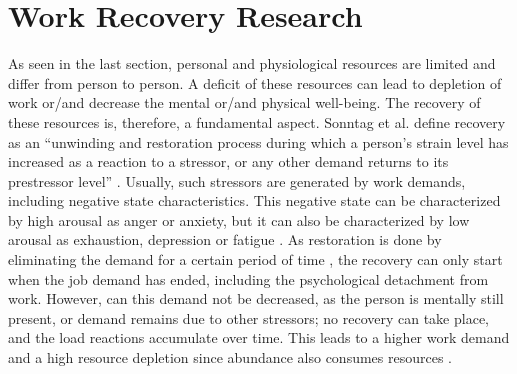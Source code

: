 \documentclass{hasel_thesis}
\begin{document}
 \section{Work Recovery Research}
  \begin{comment} 
 - why are we looking at recovery for work --> many knowledge workers are stressed and recovery is key
  - How can we recharge this resources
 - Different ways of recovery: 
    - organisational
    individual -->breaks

 
\end{comment}
As seen in the last section, personal and physiological resources are limited and differ from person to person. A deficit of these resources can lead to depletion of work or/and decrease the mental or/and physical well-being. The recovery of these resources is, therefore, a fundamental aspect. Sonntag et al. define recovery as an “unwinding and restoration process during which a person’s strain level has increased as a reaction to a stressor, or any other demand returns to its prestressor level” \cite[p.366]{Sonnentag.2017}. Usually, such stressors are generated by work demands, including negative state characteristics. This negative state can be characterized by high arousal as anger or anxiety, but it can also be characterized by low arousal as exhaustion, depression or fatigue \cite{Sonnentag.2022}. As restoration is done by eliminating the demand for a certain period of time \cite{Trougakos.2009}, the recovery can only start when the job demand has ended, including the psychological detachment from work. 
However, can this demand not be decreased, as the person is mentally still present, or demand remains due to other stressors; no recovery can take place, and the load reactions accumulate over time. This leads to a higher work demand and a high resource depletion since abundance also consumes resources \cite{Trougakos.2009}.
\end{document}
